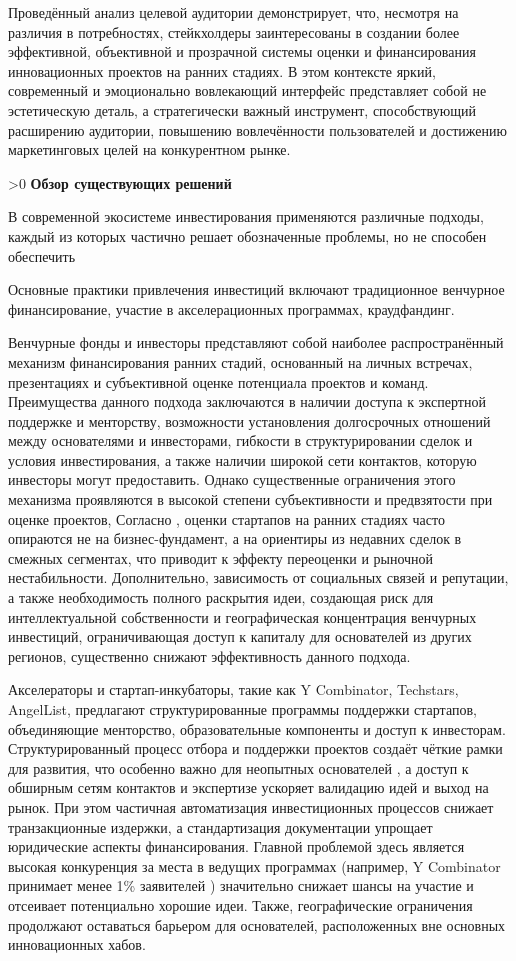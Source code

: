\documentclass[
    14pt,
    specialist,
    candidate, %
    subf, %
    href,
    dotsinheaders=false
]{disser}
\newcommand{\mysection}[1]{%
  \ifnum\value{section}>0
  \vspace{1em}
  \fi
  \refstepcounter{section}
  \hypertarget{sec:\thechapter.\thesection}{}%
  \textbf{\thesection\space #1}
  \addcontentsline{toc}{section}{\texorpdfstring{\thesection\hspace{2em}#1}{Section \thesection}}%
}
\renewcommand{\thechapter}{\arabic{chapter}}
\begin{document}
Проведённый анализ целевой аудитории демонстрирует, что, несмотря на различия в потребностях, стейкхолдеры заинтересованы в создании более эффективной, объективной и прозрачной системы оценки и финансирования инновационных проектов на ранних стадиях. В этом контексте яркий, современный и эмоционально вовлекающий интерфейс представляет собой не эстетическую деталь, а стратегически важный инструмент, способствующий расширению аудитории, повышению вовлечённости пользователей и достижению маркетинговых целей на конкурентном рынке.

\mysection{Обзор существующих решений}

В современной экосистеме инвестирования применяются различные подходы, каждый из которых частично решает обозначенные проблемы, но не способен обеспечить

Основные практики привлечения инвестиций включают традиционное венчурное финансирование, участие в акселерационных программах, краудфандинг.

Венчурные фонды и инвесторы представляют собой наиболее распространённый механизм финансирования ранних стадий, основанный на личных встречах, презентациях и субъективной оценке потенциала проектов и команд. Преимущества данного подхода заключаются в наличии доступа к экспертной поддержке и менторству, возможности установления долгосрочных отношений между основателями и инвесторами, гибкости в структурировании сделок и условия инвестирования, а также наличии широкой сети контактов, которую инвесторы могут предоставить. Однако существенные ограничения этого механизма проявляются в высокой степени субъективности и предвзятости при оценке проектов, Согласно \cite{imbierowicz2024peer}, оценки стартапов на ранних стадиях часто опираются не на бизнес-фундамент, а на ориентиры из недавних сделок в смежных сегментах, что приводит к эффекту переоценки и рыночной нестабильности. Дополнительно, зависимость от социальных связей и репутации, а также необходимость полного раскрытия идеи, создающая риск для интеллектуальной собственности и географическая концентрация венчурных инвестиций, ограничивающая доступ к капиталу для основателей из других регионов, существенно снижают эффективность данного подхода.

Акселераторы и стартап-инкубаторы, такие как Y Combinator, Techstars, AngelList, предлагают структурированные программы поддержки стартапов, объединяющие менторство, образовательные компоненты и доступ к инвесторам. Структурированный процесс отбора и поддержки проектов создаёт чёткие рамки для развития, что особенно важно для неопытных основателей \cite{thiel2014zero}, а доступ к обширным сетям контактов и экспертизе ускоряет валидацию идей и выход на рынок. При этом частичная автоматизация инвестиционных процессов снижает транзакционные издержки, а стандартизация документации упрощает юридические аспекты финансирования. Главной проблемой здесь является высокая конкуренция за места в ведущих программах (например, Y Combinator принимает менее 1\% заявителей \cite{yc_acceptance_rate}) значительно снижает шансы на участие и отсеивает потенциально хорошие идеи. Также, географические ограничения продолжают оставаться барьером для основателей, расположенных вне основных инновационных хабов.
\end{document}
